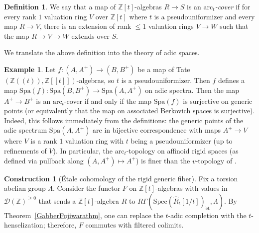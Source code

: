 \documentclass[reqno]{amsart}
\newcommand{\spec}{\mathrm{Spec}}
\newcommand{\et}{\mathrm{\acute{e}t}}
\newcommand{\arc}{\mathrm{arc}}
\newcommand{\D}{\mathcal{D}}
\theoremstyle{definition}
\newtheorem{definition}[theorem]{Definition}
\newtheorem{example}[theorem]{Example}
\newtheorem{cons}[theorem]{Construction}
\begin{document}
\begin{definition} 
\label{DefArct}
We say that a map of $\mathbb{Z}[t]$-algebras $R \to S$ is an {\em $\arc_{t}$-cover}
if for every rank $ 1$ valuation ring $V$ over $\mathbb{Z}[t]$ where $t$ is
a pseudouniformizer and every map $R \to V$, there is an extension 
of rank $\leq 1$ valuation rings  $V \to W$ such that the map $R \to V \to W$
extends over $S$. 
\end{definition} 

We translate the above definition into the theory of adic spaces.

\begin{example}
Let $f\colon (A,A^+) \to (B,B^+)$ be a map of Tate $(\mathbb{Z}((t)), \mathbb{Z}[[t]])$-algebras, so $t$ is a pseudouniformizer. Then $f$ defines a map $\mathrm{Spa}(f)\colon \mathrm{Spa}(B,B^+) \to \mathrm{Spa}(A,A^+)$ on adic spectra. Then the map $A^+ \to B^+$ is an $\arc_t$-cover if and only if the map $\mathrm{Spa}(f)$ is surjective on generic points (or equivalently that the map on associated Berkovich spaces is surjective). Indeed, this follows immediately from the definitions: the generic points of the adic spectrum $\mathrm{Spa}(A,A^+)$ are in bijective correspondence with maps $A^+ \to V$ where $V$ is a rank $1$ valuation ring with $t$ being a pseudouniformizer (up to refinements of $V$). In particular, the $\arc_t$-topology on affinoid rigid spaces (as defined via pullback along $(A,A^+) \mapsto A^+$) is finer than the $v$-topology of \cite[Definition 8.1]{ScholzeDiamonds}.
\end{example}


\begin{cons}[\'Etale cohomology of the rigid generic fiber]
\label{etcohrigidgenericfib}
Fix a torsion abelian group $\Lambda$. 
Consider the functor $F$ on $\mathbb{Z}[t]$-algebras with values in $\D(
\mathbb{Z})^{\geq 0}$
that sends a
$\mathbb{Z}[t]$-algebra $R$ to $R \Gamma(  \spec(\hat{R}_t[1/t])_{\et},
\Lambda)$. 
By Theorem~\ref{GabberFujiwarathm}, one can replace the $t$-adic completion
with the $t$-henselization; therefore, $F$ commutes with filtered colimits. 
\label{rigidcoh}
\end{cons}
\end{document}

